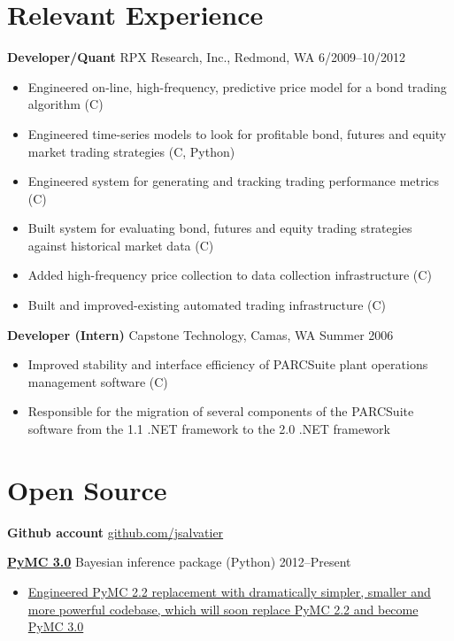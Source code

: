 \documentclass[margin]{res}
\newcommand{\bitem}{\begin{samepage}\begin{itemize} \itemsep -2pt}
\newcommand{\eitem}{\end{itemize}\end{samepage} }
\newcommand{\hrowbase}[3]{
  {\bf #1} #2 \hfill #3
}
\newcommand{\headrow}[3]{
  \hrowbase{#1}{#2}{#3}
    \vspace{6pt}
    \bitem
      }
\newcommand{\eheadrow}[0]{\eitem}
\newcommand{\CS}
{C\nolinebreak[4]\hspace{-.05em}\raisebox{.22ex}{\footnotesize\#}}
\begin{document}
 

\resumewidth=6.5in
\newsectionwidth{1.0in}
\begin{resume} 
 

\section{Relevant Experience}
  \headrow{Developer/Quant}{RPX Research, Inc., Redmond, WA}{6/2009--10/2012}
     \item Engineered on-line, high-frequency, predictive price model for a bond trading algorithm (\CS)
     \item Engineered time-series models to look for profitable bond, futures and equity market trading strategies (\CS, Python) 
     \item Engineered system for generating and tracking trading performance metrics (\CS)
     \item Built system for evaluating bond, futures and equity trading strategies against historical market data (\CS) 
     \item Added high-frequency price collection to data collection infrastructure (\CS)
     \item Built and improved-existing automated trading infrastructure (\CS)
  \eheadrow

  \headrow{Developer (Intern)}{Capstone Technology, Camas, WA}{Summer 2006}
    \item Improved stability and interface efficiency of PARCSuite plant operations management software (\CS)
    \item Responsible for the migration of several components of the PARCSuite software from the 1.1 .NET framework to the 2.0 .NET framework 
  \eheadrow

 \section{Open Source}
 {\bf Github account} \href{https://github.com/jsalvatier}{github.com/jsalvatier}

    \headrow{\href{https://github.com/pymc-devs/pymc/commits/pymc3\#readme}{PyMC 3.0}}{Bayesian inference package (Python)}{2012--Present}
      \item \href{https://github.com/pymc-devs/pymc/commits/pymc3}{Engineered PyMC 2.2 replacement with dramatically simpler, smaller and more powerful codebase, which will soon replace PyMC 2.2 and become PyMC 3.0}
    \eheadrow


\end{resume}
\end{document}
